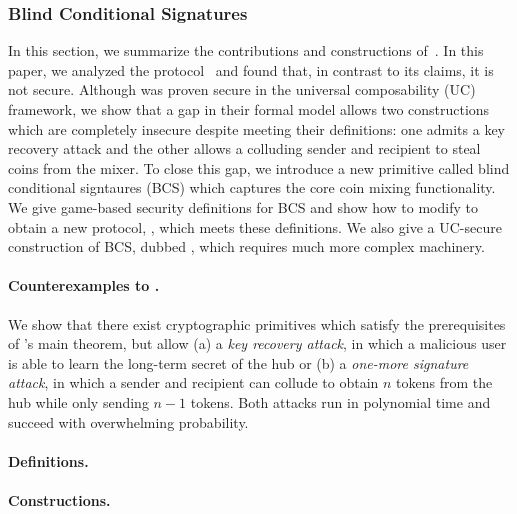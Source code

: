 \subsubsection{Blind Conditional Signatures}
In this section, we summarize the contributions and constructions of~\cite{CCS:GMMMTT22}. In this paper, we analyzed the \AAL protocol~\cite{SP:TaiMorMaf21} and found that, in contrast to its claims, it is not secure. Although \AAL was proven secure in the universal composability (UC)~\cite{FOCS:Canetti01} framework, we show that a gap in their formal model allows two constructions which are completely insecure despite meeting their definitions: one admits a key recovery attack and the other allows a colluding sender and recipient to steal coins from the mixer. To close this gap, we introduce a new primitive called blind conditional signtaures (BCS) which captures the core coin mixing functionality. We give game-based security definitions for BCS and show how to modify \AAL to obtain a new protocol, \AALplus, which meets these definitions. We also give a UC-secure construction of BCS, dubbed \AALUC, which requires much more complex machinery. 

\paragraph{Counterexamples to \AAL.} We show that there exist cryptographic primitives which satisfy the prerequisites of \AAL's main theorem, but allow (a) a \emph{key recovery attack}, in which a malicious user is able to learn the long-term secret of the hub or (b) a \emph{one-more signature attack}, in which a sender and recipient can collude to obtain $n$ tokens from the hub while only sending $n-1$ tokens. Both attacks run in polynomial time and succeed with overwhelming probability. 

\paragraph{Definitions.} 

\paragraph{Constructions.} 
